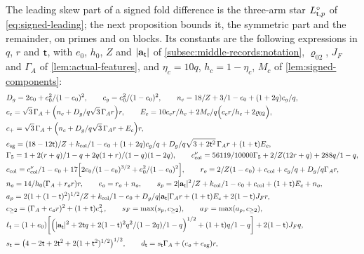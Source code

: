The leading skew part of a signed fold difference is the three-arm star
$L^\circ_{\mathsf t,p}$ of \eqref{eq:signed-leading}; the next proposition bounds it,
the symmetric part and the remainder, on primes and on blocks. Its constants
are the following expressions in $q$, $r$ and $\mathsf t$, with $e_0$, $h_0$, $Z$ and
$|\mathbf a_\mathsf t|$ of \cref{subsec:middle-records:notation}, $\varrho_{02}$, $J_F$
and $\Gamma_A$ of \cref{lem:actual-features}, and $\eta_c=10q$, $h_c=1-\eta_c$, $M_c$
of \cref{lem:signed-components}:
\begin{equation}\label{eq:signed-constants}
\begin{aligned}
 &D_g=2e_0+e_0^2/(1-e_0)^2,\qquad c_g=e_0^2/(1-e_0)^2,\qquad
  n_c=18/Z+3/1-e_0+(1+2q)c_g/q,\\
 &c_c=\sqrt3\,\Gamma_A+\Bigl(n_c+D_g/q\sqrt3\,\Gamma_Ar\Bigr)r,\qquad
  E_c=10c_cr/h_c+2M_c/q\Bigl(c_cr/h_c+2\varrho_{02}\Bigr),\\
 &c_+=\sqrt3\,\Gamma_A+\Bigl(n_c+D_g/q\sqrt3\,\Gamma_Ar+E_c\Bigr)r,\\
 &e_{\rm sg}=(18-12\mathsf t)/Z+k_{\rm col}/1-e_0+(1+2q)c_g/q
  +D_g/q\sqrt{3+2\mathsf t^2}\,\Gamma_Ar+(1+\mathsf t)E_c,\\
 &\Gamma_5=1+2(r+q)/1-q+2q(1+r)/(1-q)(1-2q),\qquad
  c^\nu_{\rm col}=56119/10000\Gamma_5+2/Z(12r+q)+288q/1-q,\\
 &c_{\rm col}=c^\nu_{\rm col}/1-e_0
  +17\Bigl[2e_0/(1-e_0)^{3/2}+e_0^2/(1-e_0)^2\Bigr],\qquad
  r_o=2/Z(1-e_0)+c_{\rm col}+c_g/q+D_g/q\Gamma_Ar,\\
 &n_o=14/h_0(\Gamma_A+r_or)r,\qquad e_o=r_o+n_o,\qquad
  s_p=2|\mathbf a_\mathsf t|^2/Z+k_{\rm col}/1-e_0+c_{\rm col}+(1+\mathsf t)E_c+n_o,\\
 &a_p=2(1+(1-\mathsf t)^2)^{1/2}/Z+k_{\rm col}/1-e_0
  +D_g/q|\mathbf a_\mathsf t|\Gamma_Ar+(1+\mathsf t)E_c+2(1-\mathsf t)J_Fr,\\
 &c_{\ge2}=(\Gamma_A+e_or)^2+(1+\mathsf t)c_+^2,\qquad
  s_F=\max(s_p,c_{\ge2}),\qquad a_F=\max(a_p,c_{\ge2}),\\
 &\ell_\mathsf t=(1+e_0)\biggl[\Bigl(|\mathbf a_\mathsf t|^2+2\mathsf t q
  +2(1-\mathsf t)^2q^2/(1-2q)/1-q\Bigr)^{1/2}+(1+\mathsf t)q/1-q\biggr]
  +2(1-\mathsf t)J_Fq,\\
 &s_\mathsf t=\bigl(4-2\mathsf t+2\mathsf t^2+2(1+\mathsf t^2)^{1/2}\bigr)^{1/2},\qquad
  d_\mathsf t=s_\mathsf t\Gamma_A+(e_o+e_{\rm sg})r,
\end{aligned}
\end{equation}
